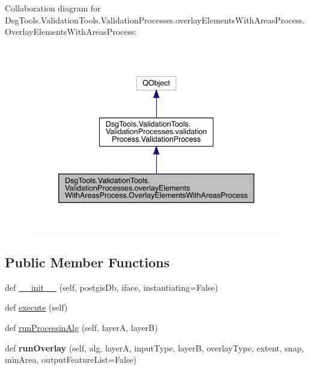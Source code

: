 Collaboration diagram for Dsg\+Tools.\+Validation\+Tools.\+Validation\+Processes.\+overlay\+Elements\+With\+Areas\+Process.\+Overlay\+Elements\+With\+Areas\+Process\+:
\nopagebreak
\begin{figure}[H]
\begin{center}
\leavevmode
\includegraphics[width=339pt]{class_dsg_tools_1_1_validation_tools_1_1_validation_processes_1_1overlay_elements_with_areas_pro05b2b5c33f613a5cb53409ff87f69228}
\end{center}
\end{figure}
\subsection*{Public Member Functions}
\begin{DoxyCompactItemize}
\item 
def \mbox{\hyperlink{class_dsg_tools_1_1_validation_tools_1_1_validation_processes_1_1overlay_elements_with_areas_pro00eacf8cfa659de181e10fade302dbfa_aa21c5daaac586f6576d4207eaa0ae753}{\+\_\+\+\_\+init\+\_\+\+\_\+}} (self, postgis\+Db, iface, instantiating=False)
\item 
def \mbox{\hyperlink{class_dsg_tools_1_1_validation_tools_1_1_validation_processes_1_1overlay_elements_with_areas_pro00eacf8cfa659de181e10fade302dbfa_a4f147f4cd0f1d45876de228b82013c45}{execute}} (self)
\item 
def \mbox{\hyperlink{class_dsg_tools_1_1_validation_tools_1_1_validation_processes_1_1overlay_elements_with_areas_pro00eacf8cfa659de181e10fade302dbfa_ad487029d2a83b2ef0bfb420575117d89}{run\+Processin\+Alg}} (self, layerA, layerB)
\item 
\mbox{\label{class_dsg_tools_1_1_validation_tools_1_1_validation_processes_1_1overlay_elements_with_areas_pro00eacf8cfa659de181e10fade302dbfa_a8264fa6e5fd0884223d30c5f2eab2c89}} 
def {\bfseries run\+Overlay} (self, alg, layerA, input\+Type, layerB, overlay\+Type, extent, snap, min\+Area, output\+Feature\+List=False)
\end{DoxyCompactItemize}

